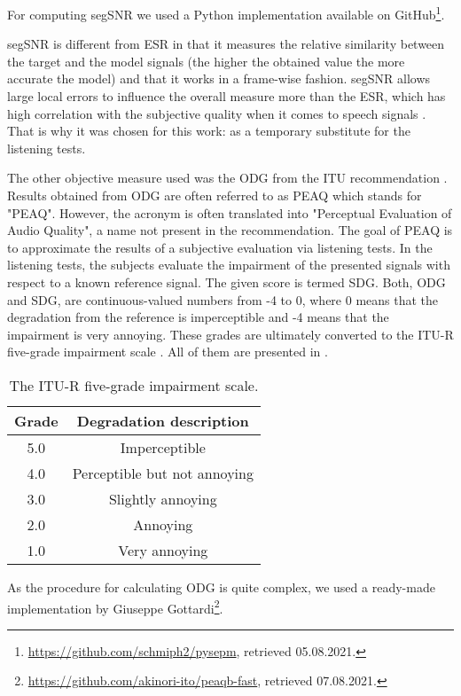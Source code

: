 

For computing \ac{segSNR} we used a Python implementation available on GitHub\footnote{\url{https://github.com/schmiph2/pysepm}, retrieved 05.08.2021.}.

\Ac{segSNR} is different from \ac{ESR} in that it measures the relative similarity between the target and the model signals (the higher the obtained value the more accurate the model) and that it works in a frame-wise fashion. \ac{segSNR} allows large local errors to influence the overall measure more than the \ac{ESR}, which has high correlation with the subjective quality when it comes to speech signals \cite{Hansen98}. That is why it was chosen for this work: as a temporary substitute for the listening tests.

The other objective measure used was the \ac{ODG} from the \ac{ITU} recommendation \cite{ITU1387}. 
Results obtained from \ac{ODG} are often referred to as \acs{PEAQ} which stands for "\acl{PEAQ}". However, the acronym is often translated into "Perceptual Evaluation of Audio Quality", a name not present in the recommendation. The goal of \acs{PEAQ} is to approximate the results of a subjective evaluation via listening tests. In the listening tests, the subjects evaluate the impairment of the presented signals with respect to a known reference signal. The given score is termed \ac{SDG}. Both, \ac{ODG} and \ac{SDG}, are continuous-valued numbers from -4 to 0, where 0 means that the degradation from the reference is imperceptible and -4 means that the impairment is very annoying. These grades are ultimately converted to the ITU-R five-grade impairment scale \cite{ITU1387}. All of them are presented in .

\begin{table}
  \centering
  \caption{The ITU-R five-grade impairment scale.}
  \begin{tabular}{c | c}
    \toprule
    \textbf{Grade} & \textbf{Degradation description} \\ \midrule
    5.0 & Imperceptible \\
    4.0 & Perceptible but not annoying \\
    3.0 & Slightly annoying \\
    2.0 & Annoying \\
    1.0 & Very annoying\\
  \end{tabular}
  \label{tab:itu_impairment_scale}
\end{table}

As the procedure for calculating \ac{ODG} is quite complex, we used a ready-made implementation by Giuseppe Gottardi\footnote{\url{https://github.com/akinori-ito/peaqb-fast}, retrieved 07.08.2021.}.
